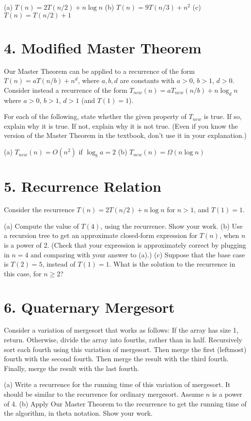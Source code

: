 \documentclass{article}
\begin{document}
(a) $T(n) = 2T(n/2) + n \log n$
(b) $T(n) = 9T(n/3) + n^2$
(c) $T(n) = T(n/2) + 1$


\section*{4. Modified Master Theorem}

Our Master Theorem can be applied to a recurrence of the form $T(n) = aT(n/b) + n^d$, where $a, b, d$ are constants with $a > 0$, $b > 1$, $d > 0$. Consider instead a recurrence of the form $T_{new}(n) = aT_{new}(n/b) + n \log_d n$ where $a > 0$, $b > 1$, $d > 1$ (and $T(1) = 1$).

For each of the following, state whether the given property of $T_{new}$ is true. If so, explain why it is true. If not, explain why it is not true. (Even if you know the version of the Master Theorem in the textbook, don’t use it in your explanation.)

(a) $T_{new}(n) = O(n^2)$ if $\log_b a = 2$
(b) $T_{new}(n) = \Omega(n \log n)$


\section*{5. Recurrence Relation}

Consider the recurrence $T(n) = 2T(n/2) + n \log n$ for $n > 1$, and $T(1) = 1$.

(a) Compute the value of $T(4)$, using the recurrence. Show your work.
(b) Use a recursion tree to get an approximate closed-form expression for $T(n)$, when $n$ is a power of 2. (Check that your expression is approximately correct by plugging in $n = 4$ and comparing with your answer to (a).)
(c) Suppose that the base case is $T(2) = 5$, instead of $T(1) = 1$. What is the solution to the recurrence in this case, for $n \geq 2$?


\section*{6. Quaternary Mergesort}

Consider a variation of mergesort that works as follows: If the array has size 1, return. Otherwise, divide the array into fourths, rather than in half. Recursively sort each fourth using this variation of mergesort. Then merge the first (leftmost) fourth with the second fourth. Then merge the result with the third fourth. Finally, merge the result with the last fourth.

(a) Write a recurrence for the running time of this variation of mergesort. It should be similar to the recurrence for ordinary mergesort. Assume $n$ is a power of 4.
(b) Apply Our Master Theorem to the recurrence to get the running time of the algorithm, in theta notation. Show your work.
\end{document}
